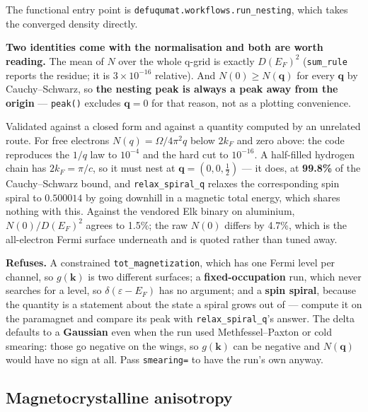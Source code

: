 \documentclass[11pt,a4paper]{article}
\newcommand{\code}[1]{\texttt{\small #1}}
\begin{document}
The functional entry point is \code{defuqumat.workflows.run\_nesting}, which
takes the converged density directly.

\textbf{Two identities come with the normalisation and both are worth reading.}
The mean of $N$ over the whole q-grid is exactly $D(E_F)^2$
(\code{sum\_rule} reports the residue; it is $3\times10^{-16}$ relative). And
$N(0) \ge N(\mathbf q)$ for every $\mathbf q$ by Cauchy--Schwarz, so
\textbf{the nesting peak is always a peak away from the origin} ---
\code{peak()} excludes $\mathbf q = 0$ for that reason, not as a plotting
convenience.

Validated against a closed form and against a quantity computed by an unrelated
route. For free electrons $N(q) = \Omega/4\pi^2 q$ below $2k_F$ and zero above:
the code reproduces the $1/q$ law to $10^{-4}$ and the hard cut to $10^{-16}$. A
half-filled hydrogen chain has $2k_F = \pi/c$, so it must nest at
$\mathbf q = (0,0,\tfrac12)$ --- it does, at \textbf{99.8\%} of the
Cauchy--Schwarz bound, and \code{relax\_spiral\_q} relaxes the corresponding
spin spiral to $0.500014$ by going downhill in a magnetic total energy, which
shares nothing with this. Against the vendored Elk binary on aluminium,
$N(0)/D(E_F)^2$ agrees to 1.5\%; the raw $N(0)$ differs by 4.7\%, which is the
all-electron Fermi surface underneath and is quoted rather than tuned away.

\begin{refuses}
\textbf{Refuses.} A constrained \code{tot\_magnetization}, which has one Fermi
level per channel, so $g(\mathbf k)$ is two different surfaces; a
\textbf{fixed-occupation} run, which never searches for a level, so
$\delta(\varepsilon - E_F)$ has no argument; and a \textbf{spin spiral}, because
the quantity is a statement about the state a spiral grows out of --- compute it
on the paramagnet and compare its peak with \code{relax\_spiral\_q}'s answer.
The delta defaults to a \textbf{Gaussian} even when the run used
Methfessel--Paxton or cold smearing: those go negative on the wings, so
$g(\mathbf k)$ can be negative and $N(\mathbf q)$ would have no sign at all.
Pass \code{smearing=} to have the run's own anyway.
\end{refuses}

\subsection{Magnetocrystalline anisotropy}
\end{document}
